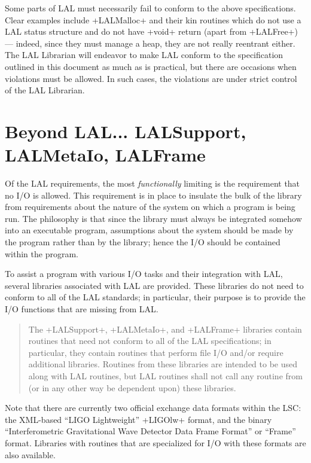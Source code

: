\documentclass[10pt]{ligodcc}
\makeatletter
\def\verb{\relax\ifmmode\hbox\else\leavevmode\null\fi
  \bgroup
    \color{blue}\small
    \verb@eol@error \let\do\@makeother \dospecials
    \verbatim@font\@noligs
    \@ifstar\@sverb\@verb}
\newlength{\fminilength}
\newenvironment{fminipage}[1][\linewidth]
  {\setlength{\fminilength}{#1-2\fboxsep-2\fboxrule}%
   \begin{lrbox}{\fminibox}\begin{minipage}{\fminilength}}
  {\end{minipage}\end{lrbox}\noindent\fbox{\usebox{\fminibox}}}
\newenvironment{lalrule}{\begin{quote}\color{red}\begin{fminipage}}
  {\end{fminipage}\end{quote}}
\makeatother
\begin{document}
Some parts of LAL must necessarily fail to conform to the above specifications.
Clear examples include \verb+LALMalloc+ and their kin routines which do not
use a LAL status structure and do not have \verb+void+ return (apart from
\verb+LALFree+) --- indeed, since they must manage a heap, they are not really
reentrant either.  The LAL Librarian will endeavor to make LAL conform to
the specification outlined in this document as much as is practical, but there
are occasions when violations must be allowed.  In such cases, the violations
are under strict control of the LAL Librarian.


\section{Beyond LAL... LALSupport, LALMetaIo, LALFrame}

Of the LAL requirements, the most \emph{functionally} limiting is the
requirement that no I/O is allowed.  This requirement is in place to
insulate the bulk of the library from requirements about the nature of
the system on which a program is being run.  The philosophy is that since
the library must always be integrated somehow into an executable program,
assumptions about the system should be made by the program rather than
by the library; hence the I/O should be contained within the program.

To assist a program with various I/O tasks and their integration with LAL,
several libraries associated with LAL are provided.  These libraries do not
need to conform to all of the LAL standards; in particular, their purpose
is to provide the I/O functions that are missing from LAL.

\begin{lalrule}
The \verb+LALSupport+, \verb+LALMetaIo+, and \verb+LALFrame+ libraries
contain routines that need not conform to all of the LAL specifications;
in particular, they contain routines that perform file I/O and/or
require additional libraries.  Routines from these libraries are
intended to be used along with LAL routines, but LAL routines shall not
call any routine from (or in any other way be dependent upon) these
libraries.
\end{lalrule}

Note that there are currently two official exchange data formats within
the LSC: the XML-based ``LIGO Lightweight'' \verb+LIGOlw+ format, and the
binary ``Interferometric Gravitational Wave Detector Data Frame Format''
or ``Frame'' format.  Libraries with routines that are specialized for I/O
with these formats are also available.
\end{document}

